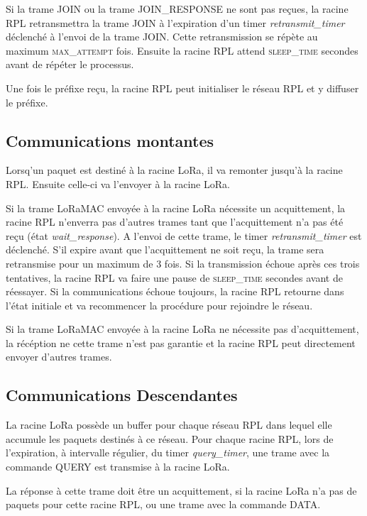     Si la trame JOIN ou la trame JOIN\_RESPONSE ne sont pas reçues, la racine RPL retransmettra la trame JOIN à l'expiration d'un timer \textit{retransmit\_timer} déclenché à l'envoi de la trame JOIN. Cette retransmission se répète au maximum \textsc{max\_attempt} fois. Ensuite la racine RPL attend \textsc{sleep\_time} secondes avant de répéter le processus.

    Une fois le préfixe reçu, la racine RPL peut initialiser le réseau RPL et y diffuser le préfixe.

\subsection*{Communications montantes}
    Lorsq'un paquet est destiné à la racine LoRa, il va remonter jusqu'à la racine RPL. Ensuite celle-ci va l'envoyer à la racine LoRa.

    Si la trame LoRaMAC envoyée à la racine LoRa nécessite un acquittement, la racine RPL n'enverra pas d'autres trames tant que l'acquittement n'a pas été reçu (état \textit{wait\_response}).
    A l'envoi de cette trame, le timer \textit{retransmit\_timer} est déclenché. S'il expire avant que l'acquittement ne soit reçu, la trame sera retransmise pour un maximum de 3 fois. Si la transmission échoue après ces trois tentatives, la racine RPL va faire une pause de \textsc{sleep\_time} secondes avant de réessayer. Si la communications échoue toujours, la racine RPL retourne dans l'état initiale et va recommencer la procédure pour rejoindre le réseau.


    Si la trame LoRaMAC envoyée à la racine LoRa ne nécessite pas d'acquittement, la récéption ne cette trame n'est pas garantie et la racine RPL peut directement envoyer d'autres trames.

\subsection*{Communications Descendantes}
    La racine LoRa possède un buffer pour chaque réseau RPL dans lequel elle accumule les paquets destinés à ce réseau. Pour chaque racine RPL, lors de l'expiration, à intervalle régulier, du timer \textit{query\_timer}, une trame avec la commande QUERY est transmise à la racine LoRa.

    La réponse à cette trame doit être un acquittement, si la racine LoRa n'a pas de paquets pour cette racine RPL, ou une trame avec la commande DATA.

